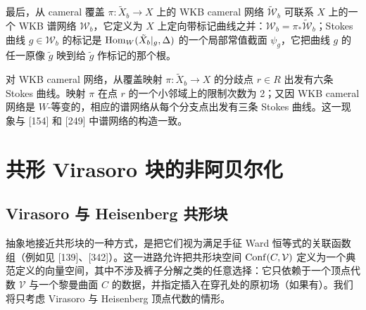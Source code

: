 最后，从 cameral 覆盖 $\pi:\tilde X_b\to X$ 上的 WKB cameral 网络 $\widetilde{\mathcal{W}}_b$ 可联系 $X$ 上的一个 WKB 谱网络 $\mathcal{W}_b$，它定义为 $X$ 上定向带标记曲线之并：$\mathcal{W}_b=\pi_*\widetilde{\mathcal{W}}_b$；Stokes 曲线 $g\in\mathcal{W}_b$ 的标记是 $\operatorname{Hom}_W(\tilde X_b|_g,\Delta)$ 的一个局部常值截面 $\psi_g$，它把曲线 $g$ 的任一原像 $\tilde g$ 映到给 $\tilde g$ 作标记的那个根。

对 WKB cameral 网络，从覆盖映射 $\pi:\tilde X_b\to X$ 的分歧点 $r\in R$ 出发有六条 Stokes 曲线。映射 $\pi$ 在点 $r$ 的一个小邻域上的限制次数为 2；又因 WKB cameral 网络是 $W$-等变的，相应的谱网络从每个分支点出发有三条 Stokes 曲线。这一现象与 [154] 和 [249] 中谱网络的构造一致。



\chapter{共形 Virasoro 块的非阿贝尔化}


\section{Virasoro 与 Heisenberg 共形块}

抽象地接近共形块的一种方式，是把它们视为满足手征 Ward 恒等式的关联函数组（例如见 [139]、[342]）。这一进路允许把共形块空间 $\operatorname{Conf}(C,\mathcal{V})$ 定义为一个典范定义的向量空间，其中不涉及裤子分解之类的任意选择：它只依赖于一个顶点代数 $\mathcal{V}$ 与一个黎曼曲面 $C$ 的数据，并指定插入在穿孔处的原初场（如果有）。我们将只考虑 Virasoro 与 Heisenberg 顶点代数的情形。

